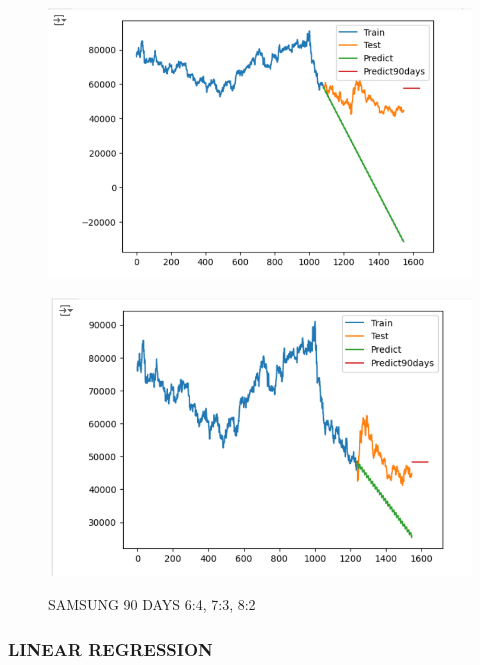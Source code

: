 \documentclass{article}
\begin{document}
\begin{multicols}{2}
\begin{figure}[H]
\begin{minipage}{0.15\textwidth}
    \label{fig:1}
    \end{minipage}%
    \begin{minipage}{0.15\textwidth}
    \centering
    \includegraphics[width=1\textwidth]{Image/ARIMA/90_7_3_SAMSUNG_Arima.png}
  
    \label{fig:2}
    \end{minipage}%
    \begin{minipage}{0.15\textwidth}
    \centering
    \includegraphics[width=1\textwidth]{Image/ARIMA/90_8_2_SAMSUNG_Arima.png}

    \label{fig:3}
    \end{minipage}
    \caption{SAMSUNG 90 DAYS  6:4, 7:3, 8:2 }
\end{figure} 
\subsubsection{LINEAR REGRESSION}




\end{multicols}
\end{document}
